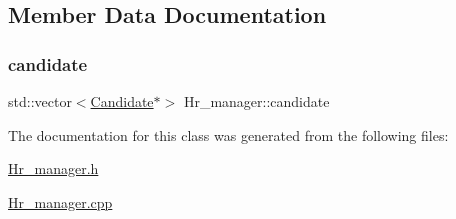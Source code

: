 \subsection{Member Data Documentation}
\hypertarget{class_hr__manager_a4f136a7a1ad3c57b8463b3e627a5c5f5}{}\label{class_hr__manager_a4f136a7a1ad3c57b8463b3e627a5c5f5} 
\subsubsection{\texorpdfstring{candidate}{candidate}}
{\footnotesize\ttfamily std\+::vector$<$\hyperlink{class_candidate}{Candidate}$\ast$$>$ Hr\+\_\+manager\+::candidate}



The documentation for this class was generated from the following files\+:\begin{DoxyCompactItemize}
\item 
\hyperlink{_hr__manager_8h}{Hr\+\_\+manager.\+h}\item 
\hyperlink{_hr__manager_8cpp}{Hr\+\_\+manager.\+cpp}\end{DoxyCompactItemize}
